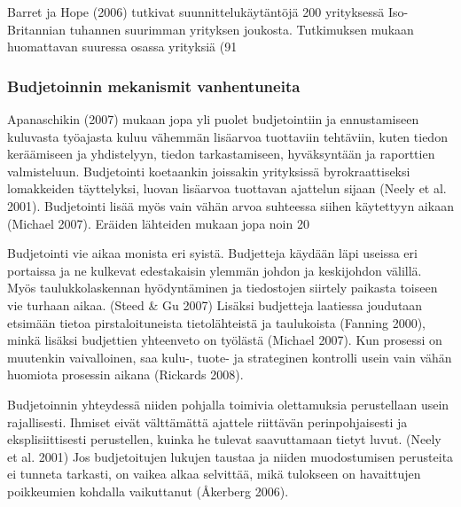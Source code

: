 \documentclass[12pt,a4paper,oneside,pdftex]{report}
\begin{document}
Barret ja Hope (2006) tutkivat suunnittelukäytäntöjä 200 yrityksessä Iso-Britannian tuhannen suurimman yrityksen joukosta. Tutkimuksen mukaan huomattavan suuressa osassa yrityksiä (91 %

\subsubsection{Budjetoinnin mekanismit vanhentuneita}

Apanaschikin (2007) mukaan jopa yli puolet budjetointiin ja ennustamiseen kuluvasta työajasta kuluu vähemmän lisäarvoa tuottaviin tehtäviin, kuten tiedon keräämiseen ja yhdistelyyn, tiedon tarkastamiseen, hyväksyntään ja raporttien valmisteluun. Budjetointi koetaankin joissakin yrityksissä byrokraattiseksi lomakkeiden täyttelyksi, luovan lisäarvoa tuottavan ajattelun sijaan (Neely et al. 2001). Budjetointi lisää myös vain vähän arvoa suhteessa siihen käytettyyn aikaan (Michael 2007). Eräiden lähteiden mukaan jopa noin 20 %

Budjetointi vie aikaa monista eri syistä. Budjetteja käydään läpi useissa eri portaissa ja ne kulkevat edestakaisin ylemmän johdon ja keskijohdon välillä. Myös taulukkolaskennan hyödyntäminen ja tiedostojen siirtely paikasta toiseen vie turhaan aikaa. (Steed & Gu 2007) Lisäksi budjetteja laatiessa joudutaan etsimään tietoa pirstaloituneista tietolähteistä ja taulukoista (Fanning 2000), minkä lisäksi budjettien yhteenveto on työlästä (Michael 2007). Kun prosessi on muutenkin vaivalloinen, saa kulu-, tuote- ja strateginen kontrolli usein vain vähän huomiota prosessin aikana (Rickards 2008).

Budjetoinnin yhteydessä niiden pohjalla toimivia olettamuksia perustellaan usein rajallisesti. Ihmiset eivät välttämättä ajattele riittävän perinpohjaisesti ja eksplisiittisesti perustellen, kuinka he tulevat saavuttamaan tietyt luvut. (Neely et al. 2001) Jos budjetoitujen lukujen taustaa ja niiden muodostumisen perusteita ei tunneta tarkasti, on vaikea alkaa selvittää, mikä tulokseen on havaittujen poikkeumien kohdalla vaikuttanut (Åkerberg 2006).
\end{document}
